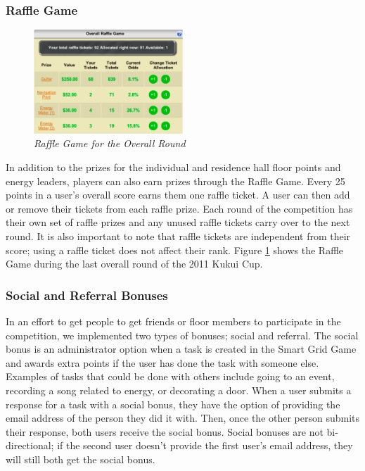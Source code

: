 \documentclass{acm_proc_article-sp}
\begin{document}
\subsubsection{Raffle Game}

\begin{figure}[t!]
  \center
  \includegraphics[width=0.5\textwidth]{raffle-small.eps}
  \caption{\em \small Raffle Game for the Overall Round}
  \label{fig:RaffleGame}
\end{figure}

In addition to the prizes for the individual and residence hall floor points and energy leaders, players can also earn prizes through the Raffle Game. Every 25 points in a user's overall score earns them one raffle ticket. A user can then add or remove their tickets from each raffle prize. Each round of the competition has their own set of raffle prizes and any unused raffle tickets carry over to the next round. It is also important to note that raffle tickets are independent from their score; using a raffle ticket does not affect their rank. Figure \ref{fig:RaffleGame} shows the Raffle Game during the last overall round of the 2011 Kukui Cup.

\subsubsection{Social and Referral Bonuses}

In an effort to get people to get friends or floor members to participate in the competition, we implemented two types of bonuses; social and referral. The social bonus is an administrator option when a task is created in the Smart Grid Game and awards extra points if the user has done the task with someone else. Examples of tasks that could be done with others include going to an event, recording a song related to energy, or decorating a door. When a user submits a response for a task with a social bonus, they have the option of providing the email address of the person they did it with. Then, once the other person submits their response, both users receive the social bonus. Social bonuses are not bi-directional; if the second user doesn't provide the first user's email address, they will still both get the social bonus.
\end{document}
